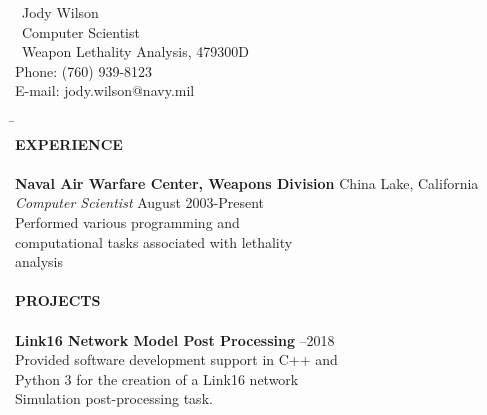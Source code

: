 \documentclass{article}
\begin{document}
\setlength{\parindent}{0pt}
\begin{centering}
\LARGE\ Jody Wilson                              \\
\large\ Computer Scientist                       \\
\normalsize\ Weapon Lethality Analysis, 479300D  \\
Phone: (760) 939-8123                            \\
E-mail: jody.wilson@navy.mil                     \\
\end{centering}

\begin{tabbing}
\hspace*{0.5in}\=\hspace*{4.25in}\=                                           \\
\textbf{EXPERIENCE}                                                           \\
                                                                              \\
\>\textbf{Naval Air Warfare Center, Weapons Division} \>China Lake, California\\
\>\textit{Computer Scientist}			      \>August 2003-Present   \\
\>Performed various programming and                                           \\
\>computational tasks associated with lethality                               \\
\>analysis                                                                    \\
                                                                              \\
\textbf{PROJECTS}                                                             \\
                                                                              \\
\>\textbf{Link16 Network Model Post Processing}	      --2018            \\
\>Provided software development support in C++ and                            \\
\>Python 3 for the creation of a Link16 network                               \\
\>Simulation post-processing task.                                            \\
                                                                              \\

\end{tabbing}
\end{document}
